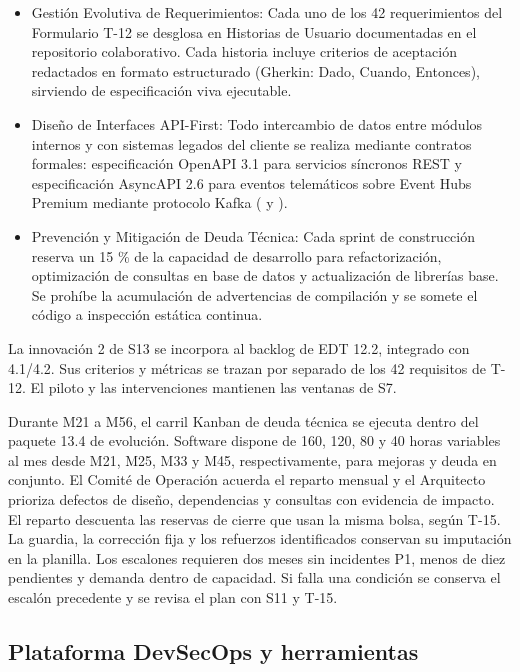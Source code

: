 \begin{itemize}
\item Gestión Evolutiva de Requerimientos: Cada uno de los 42 requerimientos del Formulario T-12 se desglosa en Historias de Usuario documentadas en el repositorio colaborativo. Cada historia incluye criterios de aceptación redactados en formato estructurado (Gherkin: Dado, Cuando, Entonces), sirviendo de especificación viva ejecutable.
\item Diseño de Interfaces API-First: Todo intercambio de datos entre módulos internos y con sistemas legados del cliente se realiza mediante contratos formales: especificación OpenAPI 3.1 para servicios síncronos REST y especificación AsyncAPI 2.6 para eventos telemáticos sobre Event Hubs Premium mediante protocolo Kafka ( y ).
\item Prevención y Mitigación de Deuda Técnica: Cada sprint de construcción reserva un 15 \% de la capacidad de desarrollo para refactorización, optimización de consultas en base de datos y actualización de librerías base. Se prohíbe la acumulación de advertencias de compilación y se somete el código a inspección estática continua.
\end{itemize}

La innovación 2 de S13 se incorpora al backlog de EDT 12.2, integrado con 4.1/4.2. Sus criterios y métricas se trazan por separado de los 42 requisitos de T-12. El piloto y las intervenciones mantienen las ventanas de S7.

Durante M21 a M56, el carril Kanban de deuda técnica se ejecuta dentro del paquete 13.4 de evolución. Software dispone de 160, 120, 80 y 40 horas variables al mes desde M21, M25, M33 y M45, respectivamente, para mejoras y deuda en conjunto. El Comité de Operación acuerda el reparto mensual y el Arquitecto prioriza defectos de diseño, dependencias y consultas con evidencia de impacto. El reparto descuenta las reservas de cierre que usan la misma bolsa, según T-15. La guardia, la corrección fija y los refuerzos identificados conservan su imputación en la planilla. Los escalones requieren dos meses sin incidentes P1, menos de diez pendientes y demanda dentro de capacidad. Si falla una condición se conserva el escalón precedente y se revisa el plan con S11 y T-15.

\FloatBarrier
\subsection{Plataforma DevSecOps y herramientas}\label{sec:6-desarrollo-devsecops}\label{sec:06-ecosistema-devsecops-unificado-en-gitlab-ci-enterprise}

